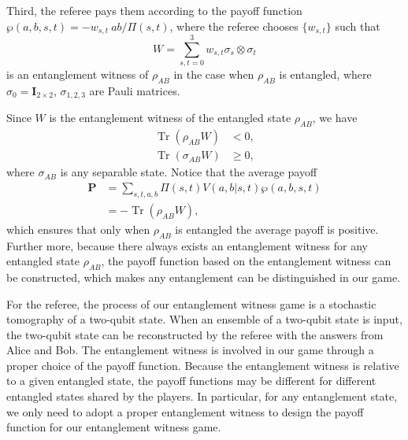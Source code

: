 \documentclass[twocolumn,pra,showpacs,superscriptaddress]{revtex4-1}
\DeclareMathOperator{\Tr}{Tr}
\begin{document}
Third, the referee pays them according to the payoff function
$\wp(a,b,s,t)=-w_{s,t}~ab/\Pi(s,t)$, where the
referee chooses $\{w_{s,t}\}$ such that
\begin{equation}
  W=\sum_{s,t=0}^3 w_{s,t}\sigma_{s}\otimes\sigma_{t}
  \label{witness}
\end{equation}
is an entanglement witness of $\rho_{AB}$ in the case when $\rho_{AB}$
is entangled, where $\sigma_0=\textbf{I}_{2\times2}$, $\sigma_{1,2,3}$ are Pauli matrices.

Since $W$ is the entanglement witness of the entangled state
$\rho_{AB}$, we have \cite{hor}\cite{guh}
\begin{align}
  \Tr(\rho_{AB} W) & < 0, \\
  \Tr(\sigma_{AB} W) & \ge 0,
\end{align}
where $\sigma_{AB}$ is any separable state. Notice that the average
payoff
\begin{align}
  \label{eq:1}
   \textbf{P} & = \sum_{s,t,a,b} \Pi(s,t) V(a,b|s,t)
               \wp(a,b,s,t) \nonumber\\
  & = - \Tr(\rho_{AB} W),
\end{align}
which ensures that only when $\rho_{AB}$ is entangled the average
payoff is positive. Further more, because there always exists an
entanglement witness for any entangled state $\rho_{AB}$, the payoff
function based on the entanglement witness can be constructed, which
makes any entanglement can be distinguished in our game.

For the referee, the process of our entanglement witness game is a stochastic
tomography of a two-qubit state. When an ensemble of a two-qubit state
is input, the two-qubit state can be reconstructed by the referee with
the answers from Alice and Bob. The entanglement witness is involved
in our game through a proper choice of the payoff function. Because
the entanglement witness is relative to a given entangled state, the
payoff functions may be different for different entangled states
shared by the players. In particular, for any entanglement state, we
only need to adopt a proper entanglement witness to design the payoff
function for our entanglement witness game.

\end{document}

